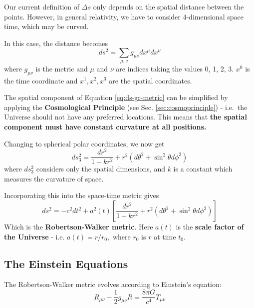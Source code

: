 \documentclass[11pt,a4paper,notoc]{tufte-handout}
\begin{document}
Our current definition of \(\Delta s\) only depends on the spatial
distance between the points. However, in general relativity, we have to
consider 4-dimensional space time, which may be curved.

In this case, the distance becomes
\begin{equation}
ds^2 = \sum_{\mu, \nu} g_{\mu\nu} dx^{\mu} dx^{\nu}
\label{eq:ds-gr-metric}
\end{equation}
where \(g_{\mu\nu}\) is the metric and \(\mu\) and \(\nu\) are indices taking
the values 0, 1, 2, 3. \(x^{0}\) is the time coordinate and
\(x^{1}, x^{2}, x^{3}\) are the spatial coordinates.

The spatial component of
Equation \eqref{eq:ds-gr-metric} can be simplified by applying the
\textbf{Cosmological Principle} (see Sec. \ref{sec:cosmoprinciple}) - i.e.~the Universe should not have any
preferred locations. This means that \textbf{the spatial component must have
constant curvature at all positions.}

Changing to spherical polar coordinates, we now get
\begin{equation}
ds^2_3 = \dfrac{dr^2}{1 - kr^2} + r^2\left(d\theta^2 + \sin^2\theta d\phi^2\right)
\label{eq:ds-gr-metric-polar}
\end{equation}
where \(ds_3^2\) considers only the spatial dimensions, and \(k\) is a
constant which measures the curvature of space.

Incorporating this into the space-time metric gives
\begin{equation}
ds^2 = -c^2 dt^2 + a^2(t) \left[\dfrac{dr^2}{1 - kr^2} + r^2\left(d\theta^2 + \sin^2\theta d\phi^2\right)\right]
\label{eq:rw-metric}
\end{equation}
Which is the \textbf{Robertson-Walker metric}. Here \(a(t)\) is the \textbf{scale
factor of the Universe} - i.e. \(a(t) = r/r_0,\) where \(r_0\) is \(r\) at
time \(t_0\).

\hypertarget{sec:einstein_eqs}{%
\subsection{The Einstein Equations}\label{sec:einstein_eqs}}

The Robertson-Walker metric evolves according to Einstein's equation:
\begin{equation}
R_{\mu\nu} - \dfrac{1}{2}g_{\mu\nu}R = \dfrac{8\pi G}{c^4} T_{\mu\nu}
\label{eq:einstein}
\end{equation}
\end{document}
